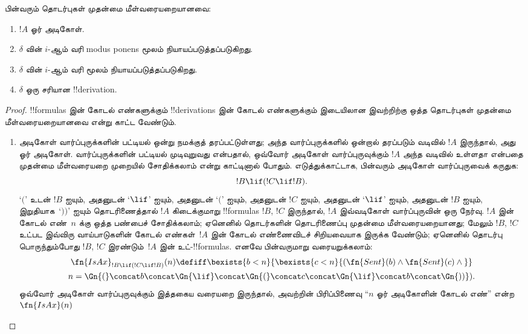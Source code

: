 \documentclass[../../../include/open-logic-section]{subfiles}
\begin{document}
\begin{prop}
பின்வரும் தொடர்புகள் முதன்மை மீள்வரையறையானவை:
\begin{enumerate}
\item $!A$ ஓர் அடிகோள்.
\item $\delta$ வின் $i$-ஆம் வரி modus ponens மூலம் நியாயப்படுத்தப்படுகிறது.
\item $\delta$ வின் $i$-ஆம் வரி \QR{} மூலம் நியாயப்படுத்தப்படுகிறது.
\item $\delta$ ஒரு சரியான !!{derivation}.
\end{enumerate}
\end{prop}

\begin{proof}
!!{formula}s இன் கோடல் எண்களுக்கும் !!{derivation}s இன் கோடல் எண்களுக்கும்
இடையிலான இவற்றிற்கு ஒத்த தொடர்புகள் முதன்மை மீள்வரையறையானவை என்று காட்ட
வேண்டும்.
\begin{enumerate}
\item அடிகோள் வார்ப்புருக்களின் பட்டியல் ஒன்று நமக்குத் தரப்பட்டுள்ளது;
  அந்த வார்ப்புருக்களில் ஒன்றால் தரப்படும் வடிவில் $!A$ இருந்தால், அது ஓர்
  அடிகோள். வார்ப்புருக்களின் பட்டியல் முடிவுறுவது என்பதால், ஒவ்வோர் அடிகோள்
  வார்ப்புருவுக்கும் $!A$ அந்த வடிவில் உள்ளதா என்பதை முதன்மை மீள்வரையறை
  முறையில் சோதிக்கலாம் என்று காட்டினால் போதும். எடுத்துக்காட்டாக, பின்வரும்
  அடிகோள் வார்ப்புருவைக் கருதுக:
  \[
  !B \lif (!C \lif !B).
  \]
  ‘$($’ உடன் $!B$ ஐயும், அதனுடன் ‘$\lif$’ ஐயும், அதனுடன் ‘$($’ ஐயும்,
  அதனுடன் $!C$ ஐயும், அதனுடன் ‘$\lif$’ ஐயும், அதனுடன் $!B$ ஐயும்,
  இறுதியாக~‘$))$’ ஐயும் தொடரிணைத்தால் $!A$ கிடைக்குமாறு
  !!{formula}s $!B$, $!C$ இருந்தால், $!A$ இவ்வடிகோள் வார்ப்புருவின் ஒரு
  நேர்வு. $!A$ இன் கோடல் எண்~$n$ க்கு ஒத்த பண்பைச் சோதிக்கலாம்; ஏனெனில்
  தொடர்களின் தொடரிணைப்பு முதன்மை மீள்வரையறையானது; மேலும் $!B$, $!C$ உட்பட
  இவ்விரு வாய்பாடுகளின் கோடல் எண்கள்~$!A$ இன் கோடல் எண்ணைவிடச்
  சிறியவையாக இருக்க வேண்டும்; ஏனெனில் தொடர்பு பொருந்தும்போது $!B$, $!C$
  இரண்டும்~$!A$ இன் உட்-!!{formula}s. எனவே பின்வருமாறு வரையறுக்கலாம்:
  \begin{multline*}
  \fn{IsAx}_{!B \lif (!C \lif !B)}(n) \defiff \bexists{b< n}{
    \bexists{c < n}{(\fn{Sent}(b) \land \fn{Sent}(c) \land {}}}\\ n =
  \Gn{(} \concat b \concat \Gn{\lif} \concat \Gn{(} \concat c \concat
  \Gn{\lif} \concat b \concat \Gn{))}).
  \end{multline*}
  ஒவ்வோர் அடிகோள் வார்ப்புருவுக்கும் இத்தகைய வரையறை இருந்தால், அவற்றின்
  பிரிப்பிணைவு “$n$ ஓர் அடிகோளின் கோடல் எண்” என்ற $\fn{IsAx}(n)$

\end{enumerate}
\end{proof}
\end{document}
